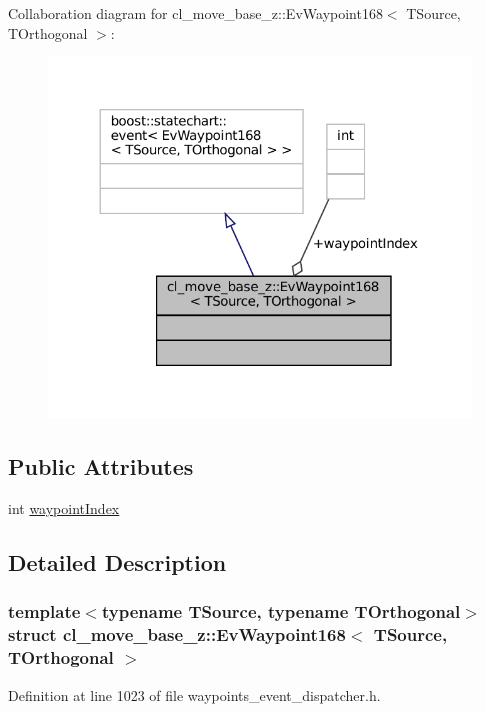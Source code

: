 Collaboration diagram for cl\+\_\+move\+\_\+base\+\_\+z\+:\+:Ev\+Waypoint168$<$ T\+Source, T\+Orthogonal $>$\+:
\nopagebreak
\begin{figure}[H]
\begin{center}
\leavevmode
\includegraphics[width=324pt]{structcl__move__base__z_1_1EvWaypoint168__coll__graph}
\end{center}
\end{figure}
\subsection*{Public Attributes}
\begin{DoxyCompactItemize}
\item 
int \hyperlink{structcl__move__base__z_1_1EvWaypoint168_a6ce19cf3c9193349e940b39e2e9734bb}{waypoint\+Index}
\end{DoxyCompactItemize}


\subsection{Detailed Description}
\subsubsection*{template$<$typename T\+Source, typename T\+Orthogonal$>$\newline
struct cl\+\_\+move\+\_\+base\+\_\+z\+::\+Ev\+Waypoint168$<$ T\+Source, T\+Orthogonal $>$}



Definition at line 1023 of file waypoints\+\_\+event\+\_\+dispatcher.\+h.



